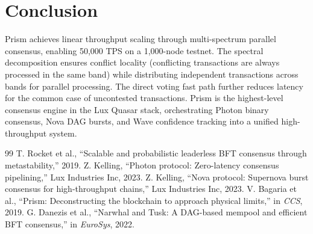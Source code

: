 \section{Conclusion}

\label{sec:conclusion}

Prism achieves linear throughput scaling through multi-spectrum parallel consensus,
enabling 50,000 TPS on a 1,000-node testnet. The spectral decomposition ensures
conflict locality (conflicting transactions are always processed in the same band)
while distributing independent transactions across bands for parallel processing.
The direct voting fast path further reduces latency for the common case of uncontested
transactions. Prism is the highest-level consensus engine in the Lux Quasar stack,
orchestrating Photon binary consensus, Nova DAG bursts, and Wave confidence tracking
into a unified high-throughput system.

\begin{thebibliography}{99}
 T. Rocket et al., ``Scalable and probabilistic leaderless BFT consensus through metastability,'' 2019.
 Z. Kelling, ``Photon protocol: Zero-latency consensus pipelining,'' Lux Industries Inc, 2023.
 Z. Kelling, ``Nova protocol: Supernova burst consensus for high-throughput chains,'' Lux Industries Inc, 2023.
 V. Bagaria et al., ``Prism: Deconstructing the blockchain to approach physical limits,'' in \emph{CCS}, 2019.
 G. Danezis et al., ``Narwhal and Tusk: A DAG-based mempool and efficient BFT consensus,'' in \emph{EuroSys}, 2022.
\end{thebibliography}

